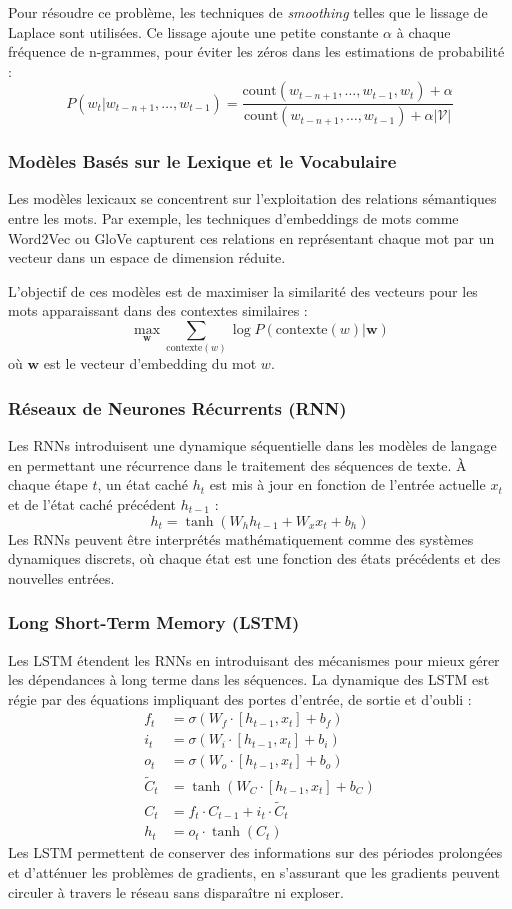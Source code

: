 \documentclass[13pt,a4paper]{article}
\begin{document}
Pour résoudre ce problème, les techniques de \textit{smoothing} telles que le lissage de Laplace sont utilisées. Ce lissage ajoute une petite constante $\alpha$ à chaque fréquence de n-grammes, pour éviter les zéros dans les estimations de probabilité :
\[
P(w_t | w_{t-n+1}, \dots, w_{t-1}) = \frac{\text{count}(w_{t-n+1}, \dots, w_{t-1}, w_t) + \alpha}{\text{count}(w_{t-n+1}, \dots, w_{t-1}) + \alpha |\mathcal{V}|}
\]

\subsubsection{Modèles Basés sur le Lexique et le Vocabulaire}
Les modèles lexicaux se concentrent sur l'exploitation des relations sémantiques entre les mots. Par exemple, les techniques d'embeddings de mots comme Word2Vec ou GloVe capturent ces relations en représentant chaque mot par un vecteur dans un espace de dimension réduite. 

L'objectif de ces modèles est de maximiser la similarité des vecteurs pour les mots apparaissant dans des contextes similaires :
\[
\max_{\mathbf{w}} \sum_{\text{contexte}(w)} \log P(\text{contexte}(w) | \mathbf{w})
\]
où $\mathbf{w}$ est le vecteur d'embedding du mot $w$.

\subsubsection{Réseaux de Neurones Récurrents (RNN)}
Les RNNs introduisent une dynamique séquentielle dans les modèles de langage en permettant une récurrence dans le traitement des séquences de texte. À chaque étape $t$, un état caché $h_t$ est mis à jour en fonction de l'entrée actuelle $x_t$ et de l'état caché précédent $h_{t-1}$ :
\[
h_t = \tanh(W_h h_{t-1} + W_x x_t + b_h)
\]
Les RNNs peuvent être interprétés mathématiquement comme des systèmes dynamiques discrets, où chaque état est une fonction des états précédents et des nouvelles entrées.

\subsubsection{Long Short-Term Memory (LSTM)}
Les LSTM étendent les RNNs en introduisant des mécanismes pour mieux gérer les dépendances à long terme dans les séquences. La dynamique des LSTM est régie par des équations impliquant des portes d'entrée, de sortie et d'oubli :
\[
\begin{aligned}
    f_t &= \sigma(W_f \cdot [h_{t-1}, x_t] + b_f) \\
    i_t &= \sigma(W_i \cdot [h_{t-1}, x_t] + b_i) \\
    o_t &= \sigma(W_o \cdot [h_{t-1}, x_t] + b_o) \\
    \tilde{C}_t &= \tanh(W_C \cdot [h_{t-1}, x_t] + b_C) \\
    C_t &= f_t \cdot C_{t-1} + i_t \cdot \tilde{C}_t \\
    h_t &= o_t \cdot \tanh(C_t)
\end{aligned}
\]
Les LSTM permettent de conserver des informations sur des périodes prolongées et d'atténuer les problèmes de gradients, en s'assurant que les gradients peuvent circuler à travers le réseau sans disparaître ni exploser.
\end{document}
